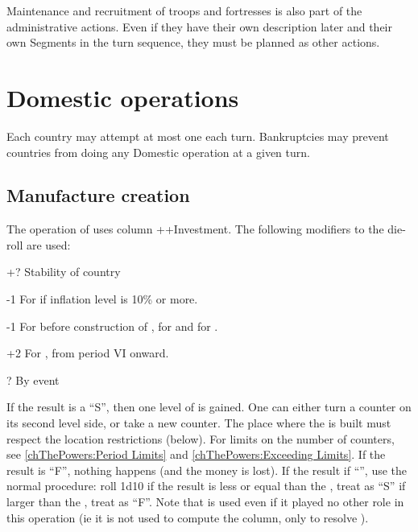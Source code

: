 \aparag Maintenance and recruitment of troops and fortresses is also part of
the administrative actions. Even if they have their own description later and
their own Segments in the turn sequence, they must be planned as other
actions.

\section{Domestic operations}\label{chExpenses:Domestic}

\aparag Each country may attempt at most one  each
turn.
\bparag Bankruptcies may prevent countries from doing any Domestic operation
at a given turn.



\subsection{Manufacture creation}

\aparag The operation of  uses column
\ADM++Investment.
\bparag The following modifiers to the die-roll are used:
\begin{modlist}
\item[+?]Stability of country
\item[-1]For \SPA if inflation level is 10\% or more.
\item[-1]For \RUS before construction of , for \TUR
  and for \POL.
\item[+2]For \ENG, from period VI onward.
\item[\textplusminus?]By event
\end{modlist}
\bparag If the result is a ``S'', then one level of \MNU is gained. One can
either turn a counter on its second level side, or take a new \MNU counter.
\bparag The place where the \MNU is built must respect the location
restrictions (below).
\bparag For limits on the number of counters, see \ref{chThePowers:Period
  Limits} and \ref{chThePowers:Exceeding Limits}.
\bparag If the result is ``F'', nothing happens (and the money is lost).
\bparag If the result if ``\undemi'', use the normal procedure: roll 1d10 if
the result is less or equal than the \FTI, treat as ``S'' if larger than the
\FTI, treat as ``F''. Note that \FTI is used even if it played no other role
in this operation (ie it is not used to compute the column, only to resolve
\undemi).

